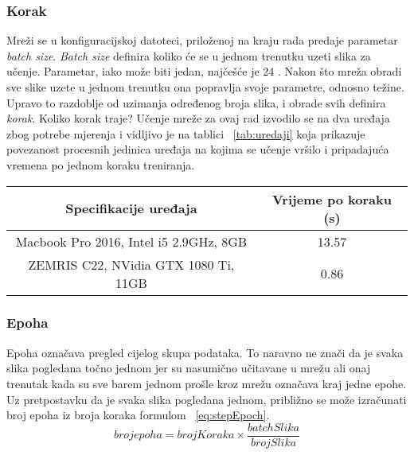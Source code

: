 \subsubsection{Korak}
Mreži se u konfiguracijskoj datoteci, priloženoj na kraju rada predaje parametar \emph{batch size}.
\emph{Batch size} definira koliko će se u jednom trenutku uzeti slika za učenje.
Parametar, iako može biti jedan, najčešće je 24 \cite{tensorflow.org}.
Nakon što mreža obradi sve slike uzete u jednom trenutku ona popravlja svoje parametre, odnosno težine.
Upravo to razdoblje od uzimanja određenog broja slika, i obrade svih definira \emph{korak}.
Koliko korak traje?
Učenje mreže za ovaj rad izvodilo se na dva uređaja zbog potrebe mjerenja i vidljivo je na tablici ~\ref{tab:uredaji} koja prikazuje povezanost procesnih jedinica uređaja na kojima se učenje vršilo i pripadajuća vremena po jednom koraku treniranja.
\begin{center}
	\begin{tabular}{||c c||}
		\hline
		Specifikacije uređaja & Vrijeme po koraku (s) \\ [0.5ex]
		\hline\hline
		Macbook Pro 2016, Intel i5 2.9GHz, 8GB & 13.57 \\
		\hline
		ZEMRIS C22, NVidia GTX 1080 Ti, 11GB & 0.86 \\ [1ex]
		\hline
	\end{tabular}
\label{tab:uredaji}
\end{center}
\subsubsection{Epoha}
Epoha označava pregled cijelog skupa podataka. 
To naravno ne znači da je svaka slika pogledana točno jednom jer su nasumično učitavane u mrežu ali onaj trenutak kada su sve barem jednom prošle kroz mrežu označava kraj jedne epohe.
Uz pretpostavku da je svaka slika pogledana jednom, približno se može izračunati broj epoha iz broja koraka formulom ~\ref{eq:stepEpoch}.
\begin{equation}
	\label{eq:stepEpoch}
	broj epoha = brojKoraka \times \frac{batchSlika}{brojSlika}
\end{equation}
